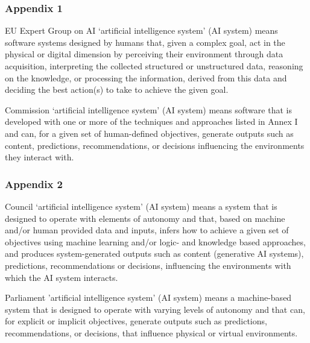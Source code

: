 \documentclass{beamer}
\begin{document}
\begin{frame}[noframenumbering]
\frametitle{Appendix 1}
\begin{block}{EU Expert Group on AI}
‘artificial intelligence system’ (AI system) means software systems designed by humans that, given a complex goal, act in the physical or digital dimension by perceiving their environment through data acquisition, interpreting the collected structured or unstructured data, reasoning on the knowledge, or processing the information, derived from this data and deciding the best action(s) to take to achieve the given goal.
\end{block}

\begin{block}{Commission}
‘artificial intelligence system’ (AI system) means software that is developed with one or more of the techniques and approaches listed in Annex I and can, for a given set of human-defined objectives, generate outputs such as content, predictions, recommendations, or decisions influencing the environments they interact with.
\end{block}
\end{frame}
\begin{frame}[noframenumbering]
\frametitle{Appendix 2}
\begin{block}{Council}
‘artificial intelligence system’ (AI system) means a system that is designed to operate with elements of autonomy and that, based on machine and/or human provided data and inputs, infers how to achieve a given set of objectives using machine learning and/or logic- and knowledge based approaches, and produces system-generated outputs such as content (generative AI systems), predictions, recommendations or decisions, influencing the environments with which the AI system interacts.
\end{block}

\begin{block}{Parliament}
’artificial intelligence system’ (AI system) means a machine-based system that is designed to operate with varying levels of autonomy and that can, for explicit or implicit objectives, generate outputs such as predictions, recommendations, or decisions, that influence physical or virtual environments.
\end{block}
\end{frame}
\end{document}

